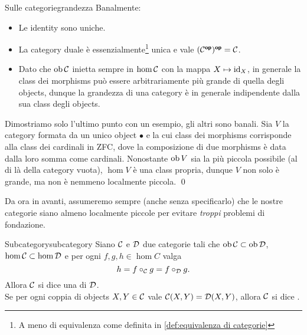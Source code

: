 \documentclass{article}
\renewcommand\C{\mc{C}}
\newcommand\D{\mc{D}}
\begin{document}

\begin{remark}{Sulle categorie}{grandezza}
    Banalmente:\begin{itemize}
        \item Le identity sono uniche.
        \item La category duale è essenzialmente\footnote{A meno di equivalenza come definita in \ref{def:equivalenza di categorie}} unica e vale $(\C^\op)^\op = \C$.
        \item Dato che $\ob\C$ inietta sempre in $\hom\C$ con la mappa $X\mapsto \operatorname{id}_X$, in generale la class dei morphisms può essere arbitrariamente più grande di quella degli objects, dunque la grandezza di una category è in generale indipendente dalla sua class degli objects.
    \end{itemize} 
    \proof 
    Dimostriamo solo l'ultimo punto con un esempio, gli altri sono banali. Sia $V$ la category formata da un unico object $\bullet$ e la cui class dei morphisms corrisponde alla class dei cardinali in ZFC, dove la composizione di due morphisms è data dalla loro somma come cardinali. Nonostante $\operatorname{ob} V$ sia la più piccola possibile (al di là della category vuota), $\hom V$ è una class propria, dunque $V$ non solo è grande, ma non è nemmeno localmente piccola.
    \qed
\end{remark}

Da ora in avanti, assumeremo sempre (anche senza specificarlo) che le nostre categorie siano almeno localmente piccole per evitare \textit{troppi} problemi di fondazione.

\begin{definition}{Subcategory}{subcategory}
    Siano $\C$ e $\D$ due categorie tali che $\ob\C \subset \ob\D$, $\hom\C \subset \hom\D$ e per ogni $f,g,h \in \hom C$ valga 
    \[h = f\circ_\C g = f\circ_\D g.\]
    Allora $\C$ si dice una  di $\D$.\\
    Se per ogni coppia di objects $X,Y \in \C$ vale $\C(X,Y)=\D(X,Y)$, allora $\C$ si dice .
\end{definition}
\end{document}
